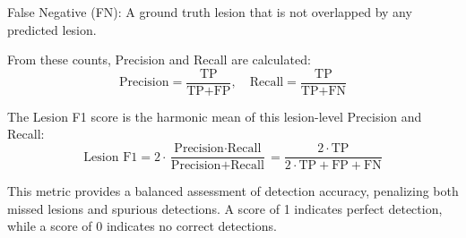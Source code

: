 False Negative (FN): A ground truth lesion that is not overlapped by any predicted lesion.

From these counts, Precision and Recall are calculated:
\begin{equation}
\text{Precision} = \frac{\text{TP}}{\text{TP} + \text{FP}}, \quad \text{Recall} = \frac{\text{TP}}{\text{TP} + \text{FN}}
\end{equation}

The Lesion F1 score is the harmonic mean of this lesion-level Precision and Recall:
\begin{equation}
\text{Lesion F1} = 2 \cdot \frac{\text{Precision} \cdot \text{Recall}}{\text{Precision} + \text{Recall}} = \frac{2 \cdot \text{TP}}{2 \cdot \text{TP} + \text{FP} + \text{FN}}
\end{equation}

This metric provides a balanced assessment of detection accuracy, penalizing both missed lesions and spurious detections. A score of 1 indicates perfect detection, while a score of 0 indicates no correct detections. 


